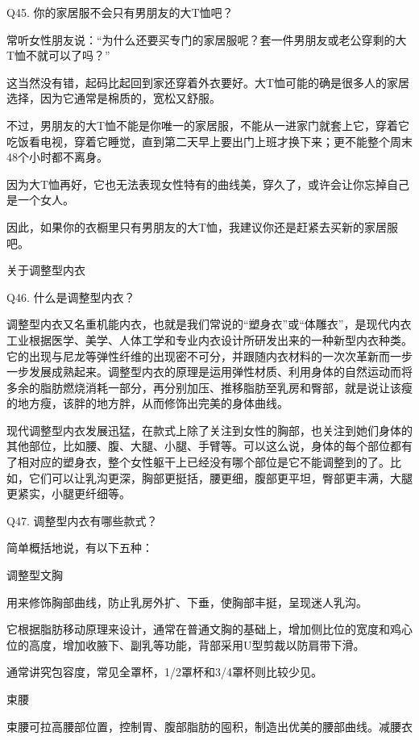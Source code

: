 \documentclass[12pt,UTF8]{ctexbook}
\begin{document}
Q45. 你的家居服不会只有男朋友的大T恤吧？


常听女性朋友说：“为什么还要买专门的家居服呢？套一件男朋友或老公穿剩的大T恤不就可以了吗？”

这当然没有错，起码比起回到家还穿着外衣要好。大T恤可能的确是很多人的家居选择，因为它通常是棉质的，宽松又舒服。

不过，男朋友的大T恤不能是你唯一的家居服，不能从一进家门就套上它，穿着它吃饭看电视，穿着它睡觉，直到第二天早上要出门上班才换下来；更不能整个周末48个小时都不离身。

因为大T恤再好，它也无法表现女性特有的曲线美，穿久了，或许会让你忘掉自己是一个女人。

因此，如果你的衣橱里只有男朋友的大T恤，我建议你还是赶紧去买新的家居服吧。





关于调整型内衣


Q46. 什么是调整型内衣？


调整型内衣又名重机能内衣，也就是我们常说的“塑身衣”或“体雕衣”，是现代内衣工业根据医学、美学、人体工学和专业内衣设计所研发出来的一种新型内衣种类。它的出现与尼龙等弹性纤维的出现密不可分，并跟随内衣材料的一次次革新而一步一步发展成熟起来。调整型内衣的原理是运用弹性材质、利用身体的自然运动而将多余的脂肪燃烧消耗一部分，再分别加压、推移脂肪至乳房和臀部，就是说让该瘦的地方瘦，该胖的地方胖，从而修饰出完美的身体曲线。

现代调整型内衣发展迅猛，在款式上除了关注到女性的胸部，也关注到她们身体的其他部位，比如腰、腹、大腿、小腿、手臂等。可以这么说，身体的每个部位都有了相对应的塑身衣，整个女性躯干上已经没有哪个部位是它不能调整到的了。比如，它们可以让乳沟更深，胸部更挺括，腰更细，腹部更平坦，臀部更丰满，大腿更紧实，小腿更纤细等。





Q47. 调整型内衣有哪些款式？


简单概括地说，有以下五种：

调整型文胸

用来修饰胸部曲线，防止乳房外扩、下垂，使胸部丰挺，呈现迷人乳沟。



它根据脂肪移动原理来设计，通常在普通文胸的基础上，增加侧比位的宽度和鸡心位的高度，增加收腋下、副乳等功能，背部采用U型剪裁以防肩带下滑。

通常讲究包容度，常见全罩杯，1/2罩杯和3/4罩杯则比较少见。

束腰

束腰可拉高腰部位置，控制胃、腹部脂肪的囤积，制造出优美的腰部曲线。减腰衣
\end{document}
